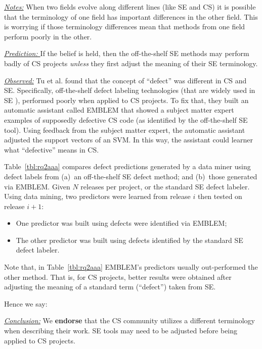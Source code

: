 \documentclass[sigconf,review,anonymous]{acmart}
\newcommand{\bi}{\begin{itemize}}
\newcommand{\ei}{\end{itemize}}
\newenvironment{RQ}{\vspace{1mm}\begin{tcolorbox}[enhanced,width=3.4in,size=fbox,colback=red!5!white,drop shadow southeast,sharp corners]}{\end{tcolorbox}}
\begin{document}
\noindent \textit{\underline{Notes:}} When two fields evolve along different
lines (like SE and CS) it is possible that the terminology of one field has important
differences in the other field. This is worrying if those terminology differences mean that methods from one field perform poorly in the other.






\noindent \textit{\underline{Prediction: }} If the belief is held, then the off-the-shelf SE methods may perform badly of CS projects {\em unless} they first adjust the meaning of their SE terminology.

\noindent \textit{\underline{Observed:}} Tu et al. \cite{tu2019better} found that the concept of ``defect'' was  different in CS and SE.
Specifically, off-the-shelf defect labeling technologies (that are widely used  in SE \cite{tu2019better,mockus00changeskeys}),
performed poorly when applied to CS projects.
To fix that, they built an automatic assistant called EMBLEM that showed a subject matter expert 
examples of supposedly defective CS code (as identified by the off-the-shelf SE tool).
Using feedback from the subject matter expert, the automatic assistant adjusted the support vectors of an SVM. In this way, the assistant could learner what ``defective'' means in CS.

Table~\ref{tbl:rq2aaa} 
compares defect predictions generated by a data
miner using defect labels from (a)~an  off-the-shelf SE defect method;
and (b)~those generated via EMBLEM. 
Given $N$ releases per project, or the standard SE defect labeler.
Using data mining, two predictors were learned from release $i$ then tested on release $i+1$:
\bi
\item
One predictor was built using defects were identified  via EMBLEM;
\item
The other predictor was built using defects identified by the standard SE defect labeler.
\ei


Note that, in Table~\ref{tbl:rq2aaa}  EMBLEM's predictors usually out-performed the other method.
That is, for CS projects,
better results were obtained after adjusting the meaning of a standard term (``defect'')
taken from SE.


Hence we say:

\begin{RQ}
\textit{\underline{Conclusion:}} We \textbf{endorse} that the CS community utilizes a different terminology when describing their work. SE tools
may need to be adjusted before being applied to CS projects.
\end{RQ}
\end{document}
